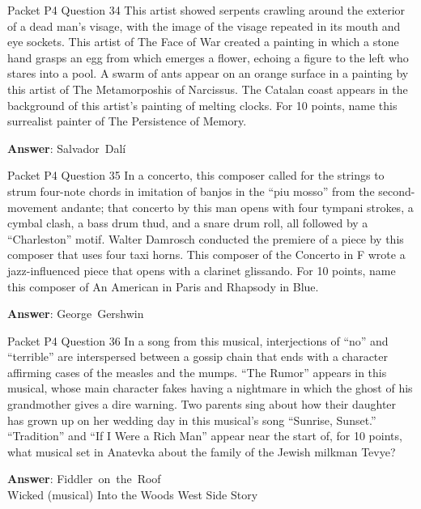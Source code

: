 \begin{frame}{Packet P4 Question 34}
This artist showed serpents crawling around the exterior of a dead man's visage, with the image of the visage repeated in its mouth and eye sockets. This artist of The Face of War created a painting in which a stone hand grasps an egg from which emerges a flower, echoing a figure to the left who stares into a pool. A swarm of ants appear on   an orange surface in a painting by this   artist of The Metamorposhis of Narcissus. The Catalan coast appears in the background of this artist's painting of melting clocks. For 10 points,   name this surrealist painter of The   Persistence of Memory.

\textbf{Answer}: Salvador\ Dalí\\
\end{frame}

\begin{frame}{Packet P4 Question 35}
In a concerto, this composer called for the strings to strum four-note chords in imitation of banjos in the ``piu mosso'' from the second-movement andante; that concerto by this man opens with four tympani strokes, a cymbal clash, a bass drum thud, and a snare drum roll, all followed by a ``Charleston'' motif.  Walter Damrosch conducted the premiere of a piece by this composer that uses four taxi horns.     This composer of the Concerto in F wrote a jazz-influenced piece that opens with a clarinet glissando.   For 10 points, name   this composer of An American in Paris and Rhapsody in Blue.

\textbf{Answer}: George\ Gershwin\\
\end{frame}

\begin{frame}{Packet P4 Question 36}
In a song from this musical, interjections of ``no'' and ``terrible'' are interspersed between a gossip chain that ends with a character affirming cases of the measles and the mumps. ``The Rumor'' appears in   this musical, whose main character fakes having a nightmare in which the ghost of his grandmother gives   a dire warning. Two parents sing about how their daughter has grown up on her wedding day in this musical's song ``Sunrise, Sunset.'' ``Tradition'' and ``If I Were   a Rich Man'' appear near the start of, for 10 points, what musical set in Anatevka about the family of the Jewish milkman Tevye?    

\textbf{Answer}: Fiddler\ on\ the\ Roof\\
 Wicked (musical)
 Into the Woods
 West Side Story
\end{frame}

